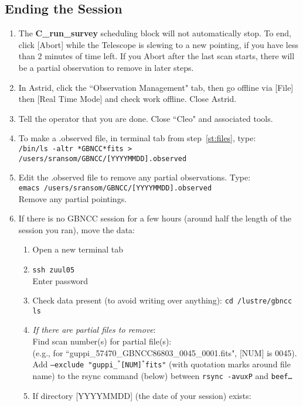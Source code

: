 \documentclass[11pt]{article}
\begin{document}
\subsection{Ending the Session} \label{ssec:qc}  %
\begin{enumerate}
 \item The \textbf{C\_run\_survey} scheduling block will not automatically stop.  To end, click [Abort] while the Telescope is slewing to a new pointing, if you have less than 2 minutes of time left.  If you Abort after the last scan starts, there will be a partial observation to remove in later steps.  
 \item In Astrid, click the ``Observation Management" tab, then go offline via [File] then [Real Time Mode] and check work offline.  Close Astrid.  
 \item Tell the operator that you are done.  Close ``Cleo" and associated tools. 
 \item To make a .observed file, in terminal tab from step~\ref{st:files}, type: \\
 \texttt{/bin/ls -altr *GBNCC*fits > /users/sransom/GBNCC/[YYYYMMDD].observed}
 \item Edit the .observed file to remove any partial observations. Type: \\
 \texttt{emacs /users/sransom/GBNCC/[YYYYMMDD].observed} \\
 Remove any partial pointings. 
 \item If there is no GBNCC session for a few hours (around half the length of the session you ran), move the data: \begin{enumerate}
  \item Open a new terminal tab
  \item \texttt{ssh zuul05} \\
  Enter password
  \item Check data present (to avoid writing over anything):
  \texttt{cd /lustre/gbncc \\
  ls} 
  \item \textit{If there are partial files to remove}: \\
  Find scan number(s) for partial file(s): \\(e.g., for ``guppi\_57470\_GBNCC86803\_0045\_0001.fits", [NUM] is 0045). \\
  Add \texttt{--exclude "guppi\_$^*$[NUM]$^*$fits"} (with quotation marks around file name) to the rsync command (below) between \texttt{rsync -avuxP} and \texttt{beef\dots}
  \item If directory [YYYYMMDD] (the date of your session) exists: \\

\end{enumerate}
\end{enumerate}
\end{document}
